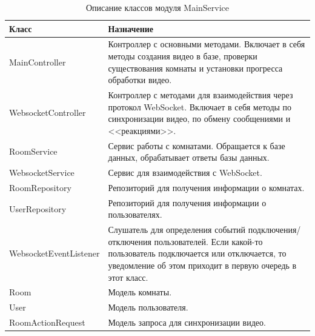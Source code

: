 \documentclass{../includes/TechDoc}
\begin{document}
    \begin{table}[h]
        \caption{\label{tab:class-AuthConfirmView-table}Описание классов модуля MainService}
        \begin{tabularx}{\textwidth}{|l|X|}
            \hline
            \textbf{Класс}          & \textbf{Назначение}                                                                            \\
            \hline
            MainController          & Контроллер с основными методами. Включает в себя методы создания видео в базе, проверки существования комнаты и установки прогресса обработки видео.                                                               \\
            \hline
            WebsocketController     & Контроллер с методами для взаимодействия через протокол WebSocket. Включает в себя методы по синхронизации видео, по обмену сообщениями и <<реакциями>>.                             \\
            \hline
            RoomService             & Сервис работы с комнатами. Обращается к базе данных, обрабатывает ответы базы данных.                                                                     \\
            \hline
            WebsocketService        & Сервис для взаимодействия с WebSocket.                                                         \\
            \hline
            RoomRepository          & Репозиторий для получения информации о комнатах.                                               \\
            \hline
            UserRepository          & Репозиторий для получения информации о пользователях.                                          \\
            \hline
            WebsocketEventListener  & Слушатель для определения событий подключения/отключения пользователей. Если какой-то пользователь подключается или отключается, то уведомление об этом приходит в первую очередь в этот класс.                        \\
            \hline
            Room                    & Модель комнаты.                                                                                \\
            \hline
            User                    & Модель пользователя.                                                                           \\
            \hline
            RoomActionRequest       & Модель запроса для синхронизации видео.                                                        \\

\end{tabularx}
\end{table}
\end{document}

